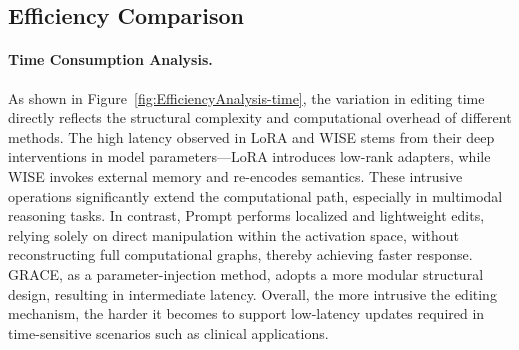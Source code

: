 \documentclass[letterpaper]{article} %
\begin{document}










\subsection{Efficiency Comparison}
\paragraph{Time Consumption Analysis.}
As shown in Figure~\ref{fig:EfficiencyAnalysis-time}, the variation in editing time directly reflects the structural complexity and computational overhead of different methods. The high latency observed in LoRA and WISE stems from their deep interventions in model parameters—LoRA introduces low-rank adapters, while WISE invokes external memory and re-encodes semantics. These intrusive operations significantly extend the computational path, especially in multimodal reasoning tasks. In contrast, Prompt performs localized and lightweight edits, relying solely on direct manipulation within the activation space, without reconstructing full computational graphs, thereby achieving faster response. GRACE, as a parameter-injection method, adopts a more modular structural design, resulting in intermediate latency. Overall, the more intrusive the editing mechanism, the harder it becomes to support low-latency updates required in time-sensitive scenarios such as clinical applications.
\end{document}

